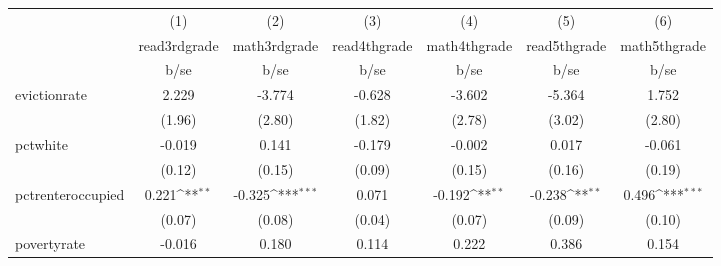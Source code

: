 {
\def\sym#1{\ifmmode^{#1}\else\(^{#1}\)\fi}
\begin{tabular}{l*{6}{c}}
\hline\hline
            &\multicolumn{1}{c}{(1)}           &\multicolumn{1}{c}{(2)}           &\multicolumn{1}{c}{(3)}           &\multicolumn{1}{c}{(4)}           &\multicolumn{1}{c}{(5)}           &\multicolumn{1}{c}{(6)}           \\
            &\multicolumn{1}{c}{read3rdgrade}  &\multicolumn{1}{c}{math3rdgrade}  &\multicolumn{1}{c}{read4thgrade}  &\multicolumn{1}{c}{math4thgrade}  &\multicolumn{1}{c}{read5thgrade}  &\multicolumn{1}{c}{math5thgrade}  \\
            &                     b/se         &                     b/se         &                     b/se         &                     b/se         &                     b/se         &                     b/se         \\
\hline
evictionrate&                    2.229         &                   -3.774         &                   -0.628         &                   -3.602         &                   -5.364         &                    1.752         \\
            &                   (1.96)         &                   (2.80)         &                   (1.82)         &                   (2.78)         &                   (3.02)         &                   (2.80)         \\
pctwhite    &                   -0.019         &                    0.141         &                   -0.179         &                   -0.002         &                    0.017         &                   -0.061         \\
            &                   (0.12)         &                   (0.15)         &                   (0.09)         &                   (0.15)         &                   (0.16)         &                   (0.19)         \\
pctrenteroccupied&                    0.221\sym{**} &                   -0.325\sym{***}&                    0.071         &                   -0.192\sym{**} &                   -0.238\sym{**} &                    0.496\sym{***}\\
            &                   (0.07)         &                   (0.08)         &                   (0.04)         &                   (0.07)         &                   (0.09)         &                   (0.10)         \\
povertyrate &                   -0.016         &                    0.180         &                    0.114         &                    0.222         &                    0.386         &                    0.154         \\

\end{tabular}}
